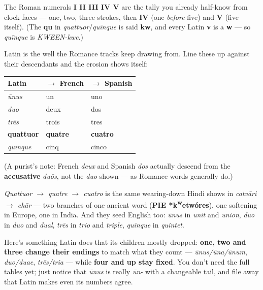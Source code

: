 The Roman numerals \textbf{I II III IV V} are the tally you already half-know from clock faces — one, two, three strokes, then \textbf{IV} (one \emph{before} five) and \textbf{V} (five itself). (The \textbf{qu} in \emph{quattuor}/\emph{quīnque} is said \textbf{kw}, and every Latin \textbf{v} is a \textbf{w} — so \emph{quīnque} is \emph{KWEEN-kwe}.)

\begin{cousinweb}
Latin is the well the Romance tracks keep drawing from. Line these up against their descendants and the erosion shows itself:

\noindent
\begin{tabularx}{\linewidth}{@{}>{\raggedright\arraybackslash}X>{\raggedright\arraybackslash}X>{\raggedright\arraybackslash}X@{}}
\toprule
\textbf{Latin} & \textbf{$\to$ French} & \textbf{$\to$ Spanish} \\
\midrule
\emph{ūnus} & un & uno \\
\emph{duo} & deux & dos \\
\emph{trēs} & trois & tres \\
\textbf{quattuor} & \textbf{quatre} & \textbf{cuatro} \\
\emph{quīnque} & cinq & cinco \\
\bottomrule
\end{tabularx}

(A purist's note: French \emph{deux} and Spanish \emph{dos} actually descend from the \textbf{accusative} \emph{duōs}, not the \emph{duo} shown — as Romance words generally do.)

\emph{Quattuor $\to$ quatre $\to$ cuatro} is the same wearing-down Hindi shows in \emph{catvāri $\to$ chār} — two branches of one ancient word (\textbf{PIE *k\textsuperscript{w}etwóres}), one softening in Europe, one in India. And they seed English too: \emph{ūnus} in \emph{unit} and \emph{union}, \emph{duo} in \emph{duo} and \emph{dual}, \emph{trēs} in \emph{trio} and \emph{triple}, \emph{quīnque} in \emph{quintet}.
\end{cousinweb}

\begin{grammarlens}[title={Grammar Lens: A grammar seed: the first three bend}]
Here's something Latin does that its children mostly dropped: \textbf{one, two and three change their endings} to match what they count — \emph{ūnus/ūna/ūnum}, \emph{duo/duae}, \emph{trēs/tria} — while \textbf{four and up stay fixed}. You don't need the full tables yet; just notice that \emph{ūnus} is really \emph{ūn-} with a changeable tail, and file away that Latin makes even its numbers agree.
\end{grammarlens}

